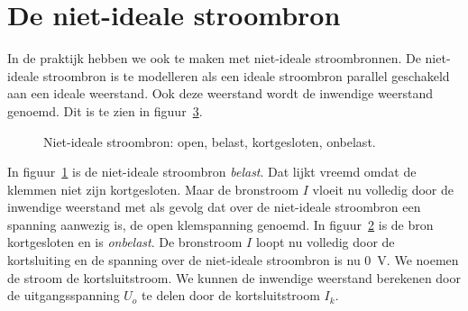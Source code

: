 \section{De niet-ideale stroombron}
\label{sec:gelnietidealestroombron}
In de praktijk hebben we ook te maken met niet-ideale stroombronnen. De niet-ideale
stroombron is te modelleren als een ideale stroombron parallel geschakeld aan een ideale
weerstand. Ook deze weerstand wordt de inwendige weerstand genoemd. Dit is te zien in
figuur~\ref{fig:gelnissopenkort}.

\begin{figure}[!ht]
\begin{subfigure}{0.5\textwidth}
\centering
{}
\caption{}
\label{fig:gelnissopen}
\end{subfigure}%
\begin{subfigure}{0.5\textwidth}
\centering
{}
\caption{}
\label{fig:gelnisskort}
\end{subfigure}
\caption{Niet-ideale stroombron:  open, belast,  kortgesloten, onbelast.}
\label{fig:gelnissopenkort}
\end{figure}

In figuur~\ref{fig:gelnissopen} is de niet-ideale stroombron \textsl{belast}. Dat lijkt vreemd omdat de klemmen niet zijn kortgesloten. Maar de bronstroom $I$ vloeit nu volledig door de inwendige weerstand met als gevolg dat over de niet-ideale stroombron een spanning aanwezig is, de open klemspanning genoemd. In figuur~\ref{fig:gelnisskort} is de bron kortgesloten en is \textsl{onbelast}. De bronstroom $I$ loopt nu volledig door de kortsluiting en de spanning over de niet-ideale stroombron is nu \SI{0}{\volt}. We noemen de stroom de kortsluitstroom. We kunnen de inwendige weerstand berekenen door de uitgangsspanning $U_o$ te delen door de kortsluitstroom $I_k$.

